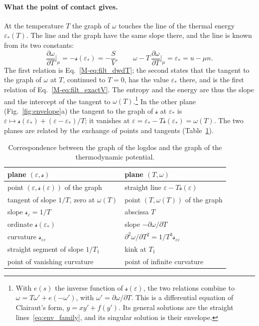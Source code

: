 \documentclass[10pt,a4paper]{article}
\theoremstyle{plain}
\theoremstyle{remark}
\newcommand{\lndos}{{logdos}}  %
\newcommand{\lds}{\mathscr{s}}  %
\begin{document}
\paragraph{What the point of contact gives.} At the temperature $T$ the
graph of $\omega$ touches the line of the thermal energy $\varepsilon_*(T)$.
The line and the graph have the same slope there, and the line is known
from its two constants:
\begin{equation}\label{eq:env_read}
  \frac{\partial\omega}{\partial T}\bigg|_{\mu}=-\lds(\varepsilon_*)=-\frac{S}{V} ,
  \qquad
  \omega-T\,\frac{\partial\omega}{\partial T}\bigg|_{\mu}=\varepsilon_*=u-\mu n .
\end{equation}
The first relation is Eq.~\eqref{M-eq:filt_dwdT}; the second states that
the tangent to the graph of $\omega$ at $T$, continued to $T=0$, has the
value $\varepsilon_*$ there, and is the first relation of
Eq.~\eqref{M-eq:filt_exactV}. The entropy and the energy are thus the slope
and the intercept of the tangent to $\omega(T)$.\footnote{With
$e(s)$ the inverse function of $\lds(\varepsilon)$, the two relations
combine to $\omega=T\omega'+e(-\omega')$, with $\omega'=\partial\omega/\partial T$.
This is a differential equation of Clairaut's form, $y=xy'+f(y')$. Its
general solutions are the straight lines~\eqref{eq:env_family}, and its
singular solution is their envelope.} In the other plane
(Fig.~\ref{fig:envelope}a) the tangent to the graph of $\lds$ at
$\varepsilon_*$ is
$\varepsilon\mapsto\lds(\varepsilon_*)+(\varepsilon-\varepsilon_*)/T$; it
vanishes at $\varepsilon=\varepsilon_*-T\lds(\varepsilon_*)=\omega(T)$. The
two planes are related by the exchange of points and tangents
(Table~\ref{tab:envelope}).

\begin{table}[htbp]
\centering
\small
\caption{Correspondence between the graph of the \lndos{} and the graph of
the thermodynamic potential.}
\label{tab:envelope}
\begin{tabular}{ll}
\toprule
plane $(\varepsilon,\lds)$ & plane $(T,\omega)$ \\
\midrule
point $(\varepsilon,\lds(\varepsilon))$ of the graph & straight line $\varepsilon-T\lds(\varepsilon)$ \\
tangent of slope $1/T$, zero at $\omega(T)$ & point $(T,\omega(T))$ of the graph \\
slope $\lds_\varepsilon=1/T$ & abscissa $T$ \\
ordinate $\lds(\varepsilon_*)$ & slope $-\partial\omega/\partial T$ \\
curvature $\lds_{\varepsilon\varepsilon}$ & $\partial^{2}\omega/\partial T^{2}=1/T^{3}\lds_{\varepsilon\varepsilon}$ \\
straight segment of slope $1/T_1$ & kink at $T_1$ \\
point of vanishing curvature & point of infinite curvature \\
\bottomrule
\end{tabular}
\end{table}
\end{document}
